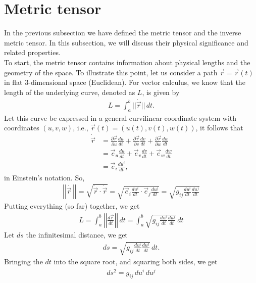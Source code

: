\documentclass{book}
\theoremstyle{definition}
\begin{document}
\section{Metric tensor}
In the previous subsection we have defined the metric tensor and the inverse metric tensor. In this subsection, we will discuss their physical significance and related properties.\\

To start, the metric tensor contains information about physical lengths and the geometry of the space. To illustrate this point, let us consider a path $\vec{r} = \vec{r}(t)$ in flat 3-dimensional space (Euclidean). For vector calculus, we know that the length of the underlying curve, denoted as $L$, is given by
\begin{align*}
L = \int_{a}^{b}\vert\vert \dot{\vec{r}}\vert\vert\,dt.
\end{align*}
Let this curve be expressed in a general curvilinear coordinate system with coordinates $(u,v,w)$, i.e., $\vec{r}(t) = (u(t),v(t),w(t))$, it follows that
\begin{align*}
\dot{\vec{r}} &= \frac{\partial \vec{r}}{\partial u}\frac{d u}{d t} + \frac{\partial \vec{r}}{\partial v}\frac{d v}{d t} + \frac{\partial \vec{r}}{\partial w}\frac{d w}{d t}\\
&= \vec{e}_u\frac{d u}{d t} + \vec{e}_v\frac{d v}{d t} + \vec{e}_w\frac{d w}{d t}\\
&= \vec{e}_i\frac{d u^i}{d t},
\end{align*} 
in Einstein's notation. So, 
\begin{align*}
\left| \left|  \dot{\vec{r}\,}\right| \right|  = \sqrt{\dot{\vec{r}}\cdot\dot{\vec{r}}} = \sqrt{\vec{e}_i\frac{d u^i}{d t}\cdot \vec{e}_j\frac{d u^j}{d t}} = \sqrt{g_{ij}\frac{du^i}{dt}\frac{du^j}{dt}}
\end{align*} 
Putting everything (so far) together, we get
\begin{align*}
\boxed{L = \int_{a}^{b}\left| \left|  \frac{d\vec{r}}{dt} \right| \right| \,dt = \int_{a}^{b}\sqrt{g_{ij}\frac{du^i}{dt}\frac{du^j}{dt}}\,dt}
\end{align*}
Let $ds$ the infinitesimal distance, we get
\begin{align*}
ds = \sqrt{g_{ij}\frac{du^i}{dt}\frac{du^j}{dt}}\,dt.
\end{align*}
Bringing the $dt$ into the square root, and squaring both sides, we get
\begin{align*}
\boxed{ds^2 = g_{ij}\,du^i\,du^j}
\end{align*}
\end{document}
